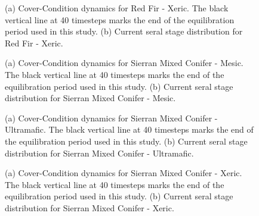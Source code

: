 \begin{figure}[!htbp]
  \centering
  \caption{(a) Cover-Condition dynamics for Red Fir - Xeric. The black vertical line at 40 timesteps marks the end of the equilibration period used in this study. (b) Current seral stage distribution for Red Fir - Xeric.} 
  \label{fig:covcond_rfrx}
\end{figure}

\begin{figure}[!htbp]
  \centering
  \caption{(a) Cover-Condition dynamics for Sierran Mixed Conifer - Mesic. The black vertical line at 40 timesteps marks the end of the equilibration period used in this study. (b) Current seral stage distribution for Sierran Mixed Conifer - Mesic.} 
  \label{fig:covcond_smcm_app}
\end{figure}


\begin{figure}[!htbp]
  \centering
  \caption{(a) Cover-Condition dynamics for Sierran Mixed Conifer - Ultramafic. The black vertical line at 40 timesteps marks the end of the equilibration period used in this study. (b) Current seral stage distribution for Sierran Mixed Conifer - Ultramafic.} 
  \label{fig:covcond_smcu}
\end{figure}

\begin{figure}[!htbp]
  \centering
  \caption{(a) Cover-Condition dynamics for Sierran Mixed Conifer - Xeric. The black vertical line at 40 timesteps marks the end of the equilibration period used in this study. (b) Current seral stage distribution for Sierran Mixed Conifer - Xeric.} 
  \label{fig:covcond_smcx_app}
\end{figure}

